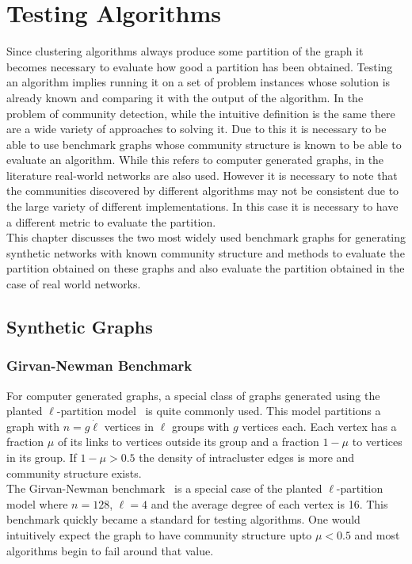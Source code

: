 \chapter{Testing Algorithms}
\begin{spacing}{1.5}
Since clustering algorithms always produce some partition of the graph it becomes necessary to evaluate how good a partition has been obtained. Testing an algorithm implies running it on a set of problem instances whose solution is already known and comparing it with the output of the algorithm. In the problem of community detection, while the intuitive definition is the same there are a wide variety of approaches to solving it. Due to this it is necessary to be able to use benchmark graphs whose community structure is known to be able to evaluate an algorithm. While this refers to computer generated graphs, in the literature real-world networks are also used. However it is necessary to note that the communities discovered by different algorithms may not be consistent due to the large variety of different implementations. In this case it is necessary to have a different metric to evaluate the partition.\\
\indent This chapter discusses the two most widely used benchmark graphs for generating synthetic networks with known community structure and methods to evaluate the partition obtained on these graphs and also evaluate the partition obtained in the case of real world networks.

\section{Synthetic Graphs}

\subsection{Girvan-Newman Benchmark}

For computer generated graphs, a special class of graphs generated using the planted $\ell$-partition model~\cite{RSA:RSA1001} is quite commonly used. This model partitions a graph with $n = g \dot \ell$ vertices in $\ell$ groups with $g$ vertices each. Each vertex has a fraction $\mu$ of its links to vertices outside its group and a fraction $1 - \mu$ to vertices in its group. If $1 - \mu > 0.5$ the density of intracluster edges is more and community structure exists.\\
\indent The Girvan-Newman benchmark~\cite{Girvan11062002} is a special case of the planted $\ell$-partition model where $n = 128$, $\ell = 4$ and the average degree of each vertex is 16.  This benchmark quickly became a standard for testing algorithms. One would intuitively expect the graph to have community structure upto $\mu < 0.5$ and most algorithms begin to fail around that value.


\end{spacing}
